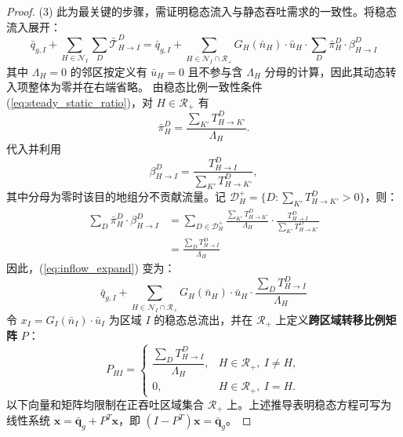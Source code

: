 \documentclass[a4paper,12pt]{article}
\theoremstyle{plain}
\theoremstyle{definition}
\theoremstyle{remark}
\begin{document}
\begin{proof}
(3) 此为最关键的步骤，需证明稳态流入与静态吞吐需求的一致性。将稳态流入展开：
\begin{equation}\label{eq:inflow_expand}
    \bar{q}_{g,I} + \sum_{H\in\mathcal N_I} \sum_D \bar{\mathcal{T}}_{H \to I}^D = \bar{q}_{g,I} + \sum_{H\in\mathcal N_I\cap\mathcal R_+} G_H(\bar{n}_H) \cdot \bar{u}_H \cdot \sum_D \bar\pi_H^D \cdot \beta_{H \to I}^D
\end{equation}
其中 $\Lambda_H=0$ 的邻区按定义有 $\bar u_H=0$ 且不参与含 $\Lambda_H$ 分母的计算，因此其动态转入项整体为零并在右端省略。
由稳态比例一致性条件 (\ref{eq:steady_static_ratio})，对 $H\in\mathcal R_+$ 有
\begin{equation}
    \bar\pi_H^D = \frac{\sum_{K'} T_{H \to K'}^D}{\Lambda_H}.
\end{equation}
代入并利用
\begin{equation}
    \beta_{H \to I}^D =
    \frac{T_{H \to I}^D}{\sum_{K'} T_{H \to K'}^D},
\end{equation}
其中分母为零时该目的地组分不贡献流量。记 $\mathcal D_H^+=\{D:\sum_{K'}T_{H\to K'}^D>0\}$，则：
\begin{equation}
\begin{aligned}
    \sum_D \bar\pi_H^D \cdot \beta_{H \to I}^D
    &= \sum_{D\in\mathcal D_H^+} \frac{\sum_{K'} T_{H \to K'}^D}{\Lambda_H} \cdot \frac{T_{H \to I}^D}{\sum_{K'} T_{H \to K'}^D} \\
    &= \frac{\sum_D T_{H \to I}^D}{\Lambda_H}
\end{aligned}
\end{equation}
因此，(\ref{eq:inflow_expand}) 变为：
\begin{equation}
    \bar{q}_{g,I} + \sum_{H\in\mathcal N_I\cap\mathcal R_+} G_H(\bar{n}_H) \cdot \bar{u}_H \cdot \frac{\sum_D T_{H \to I}^D}{\Lambda_H}
\end{equation}
令 $x_I = G_I(\bar{n}_I) \cdot \bar{u}_I$ 为区域 $I$ 的稳态总流出，并在 $\mathcal R_+$ 上定义\textbf{跨区域转移比例矩阵} $P$：
\begin{equation}\label{eq:transfer_matrix}
    P_{HI} =
    \begin{cases}
    \dfrac{\sum_D T_{H \to I}^D}{\Lambda_H}, & H\in\mathcal R_+,\ I\ne H,\\[1.0em]
    0, & H\in\mathcal R_+,\ I=H .
    \end{cases}
\end{equation}
以下向量和矩阵均限制在正吞吐区域集合 $\mathcal R_+$ 上。上述推导表明稳态方程可写为线性系统 $\bm{x} = \bar{\bm{q}}_g + P^T \bm{x}$，即 $(I - P^T)\bm{x} = \bar{\bm{q}}_g$。


\end{proof}
\end{document}
